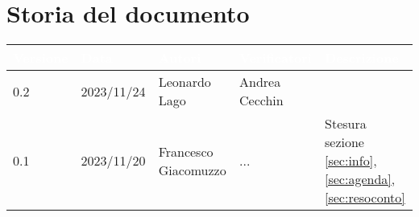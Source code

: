 \section{Storia del documento} \label{sec:storia}
\begingroup
\setlength{\tabcolsep}{10pt}
\renewcommand{\arraystretch}{1.5}
\begin{tabularx}{\textwidth}{| l | l | X | X | X |}
    \hline
    \rowcolor{headerrow} \textbf{\textcolor{white}{Versione}} & \textbf{\textcolor{white}{Data}} & \textbf{\textcolor{white}{Autori}} & \textbf{\textcolor{white}{Verificatori}} & \textbf{\textcolor{white}{Descrizione}} \\
    \hline
    0.2 & 2023/11/24 & Leonardo Lago & Andrea Cecchin & \\
    \hline
    0.1 & 2023/11/20 & Francesco Giacomuzzo & ... & Stesura sezione \ref{sec:info}, \ref{sec:agenda},\ref{sec:resoconto}\\
    \hline
\end{tabularx}
\endgroup